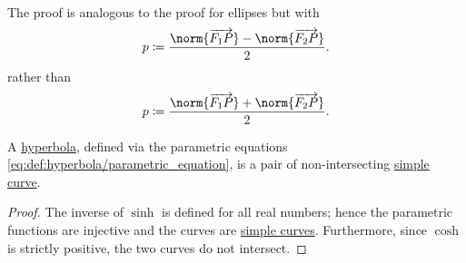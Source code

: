 \begin{defproof}
   The proof is analogous to the proof for ellipses but with
  \begin{equation*}
    p \coloneqq \frac {\norm{\vect{F_1 P}} - \norm{\vect{F_2 P}}} 2.
  \end{equation*}
  rather than
  \begin{equation*}
    p \coloneqq \frac {\norm{\vect{F_1 P}} + \norm{\vect{F_2 P}}} 2.
  \end{equation*}
\end{defproof}

\begin{proposition}\label{thm:hyperbola_is_closed_simple_curve}
  A \hyperref[def:hyperbola]{hyperbola}, defined via the parametric equations \eqref{eq:def:hyperbola/parametric_equation}, is a pair of non-intersecting \hyperref[def:simple_curve]{simple curve}.
\end{proposition}
\begin{proof}
  The inverse of \( \sinh \) is defined for all real numbers; hence the parametric functions are injective and the curves are \hyperref[def:simple_curve]{simple curves}. Furthermore, since \( \cosh \) is strictly positive, the two curves do not intersect.
\end{proof}

